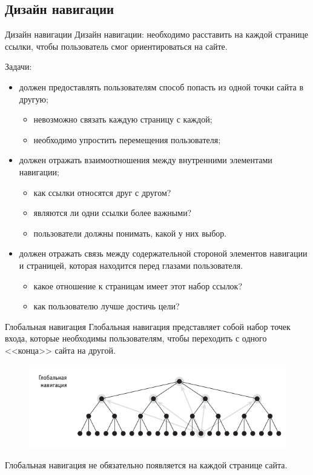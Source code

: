 \documentclass{beamer}
\begin{document}
\subsection{Дизайн навигации}
\begin{frame}[t]{Дизайн навигации}
Дизайн навигации: необходимо расставить на каждой странице ссылки, чтобы пользователь смог ориентироваться на сайте. 

Задачи:
\begin{itemize}
\item должен предоставлять пользователям способ попасть из одной точки сайта в другую; 
	\begin{itemize}
	\item невозможно связать каждую страницу с каждой;
	\item необходимо упростить перемещения пользователя;	
	\end{itemize}
\item должен отражать взаимоотношения между внутренними элементами навигации;
	\begin{itemize}
	\item как ссылки относятся друг с другом?
	\item являются ли одни ссылки более важными?
	\item пользователи должны понимать, какой у них выбор.
	\end{itemize}
\item должен отражать связь между содержательной стороной элементов навигации и страницей, которая находится перед глазами пользователя.
	\begin{itemize}
	\item какое отношение к страницам имеет этот набор ссылок?
	\item как пользователю лучше достичь цели?
	\end{itemize}	
\end{itemize}
\end{frame}

\begin{frame}[t]{Глобальная навигация}
Глобальная навигация представляет собой набор точек входа, которые необходимы пользователям, чтобы переходить с одного <<конца>> сайта на другой.
\begin{figure}[h]
\centering
\includegraphics[scale=0.5]{images/lec04-pic12.png}
\end{figure}

Глобальная навигация не обязательно появляется на каждой странице сайта.
\end{frame}
\end{document}
